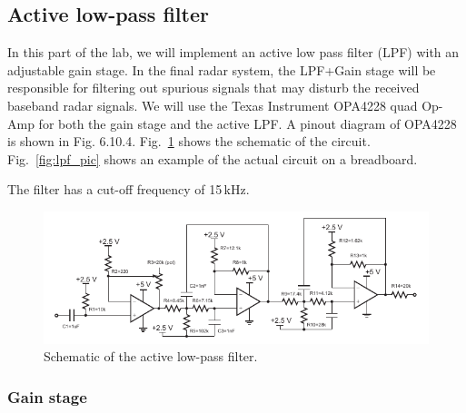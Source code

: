 \documentclass[letterpaper, 11pt]{article}
\begin{document}
\subsection{Active low-pass filter}
\label{sec:lpf}

In this part of the lab, we will implement an active low pass filter (LPF) with an adjustable gain stage. In the final radar system, the LPF+Gain stage will be responsible for filtering out spurious signals that may disturb the received baseband radar signals. We will use the Texas Instrument OPA4228 quad Op-Amp for both the gain stage and the active LPF. A pinout diagram of OPA4228 is shown in Fig. 6.10.4. Fig.~\ref{fig:lpf-sch} shows the schematic of the circuit. Fig.~\ref{fig:lpf_pic} shows an example of the actual circuit on a breadboard. 

The filter has a cut-off frequency of 15\,kHz. 



\begin{figure}[h]
	\centering
	\includegraphics[width=5.3in]{lpf-sch}
	\caption{Schematic of the active low-pass filter.}
	\label{fig:lpf-sch}
\end{figure}

\subsubsection{Gain stage}
\end{document}
